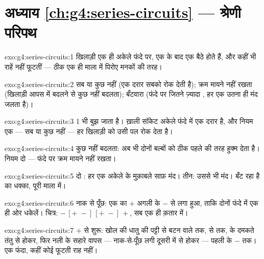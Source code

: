\section*{अध्याय \ref{ch:g4:series-circuits} --- श्रेणी परिपथ}

\begin{solution}{exo:g4:series-circuits:1}
खिलाड़ी एक ही अकेले फंदे पर, एक के बाद एक बैठे होते हैं, और कहीं भी
राहें नहीं फूटतीं --- ठीक एक ही माला में पिरोए मनकों की तरह।
\end{solution}

\begin{solution}{exo:g4:series-circuits:2}
सब या कुछ नहीं (एक दरार सबको रोक देती है); क्रम मायने नहीं रखता
(खिलाड़ी आपस में बदलने से कुछ नहीं बदलता); बँटवारा (फंदे पर जितने
ज़्यादा , हर एक उतना ही मंद जलता है)।
\end{solution}

\begin{solution}{exo:g4:series-circuits:3}
 1 भी बुझ जाता है। ख़ाली सॉकेट अकेले फंदे में एक दरार है, और
नियम एक --- सब या कुछ नहीं --- हर खिलाड़ी को उसी पल रोक देता है।
\end{solution}

\begin{solution}{exo:g4:series-circuits:4}
कुछ नहीं बदलता:  अब भी दोनों बल्बों को ठीक पहले की तरह हुक्म
देता है। नियम दो --- फंदे पर क्रम मायने नहीं रखता।
\end{solution}

\begin{solution}{exo:g4:series-circuits:5}
दो : हर एक अकेले  के मुक़ाबले साफ़ मंद। तीन: उससे भी मंद।
बँट रहा है  का धक्का, पूरी माला में।
\end{solution}

\begin{solution}{exo:g4:series-circuits:6}
नाक से पूँछ: एक का $+$ अगली के $-$ से लगा हुआ, ताकि दोनों फंदे में
एक ही ओर धकेलें। चित्र: $-\,[{+}\;{-}]\,[{+}\;{-}]\,+$, सब एक ही
क़तार में।
\end{solution}

\begin{solution}{exo:g4:series-circuits:7}
$+$ से शुरू: खोल की धातु की पट्टी से बटन वाले  तक,  से
 तक,  के दमकते तंतु से होकर, फिर नली के सहारे वापस ---
नाक-से-पूँछ लगी दूसरी  में से होकर --- पहली  के $-$ तक।
एक फंदा, कहीं कोई फूटती राह नहीं।
\end{solution}

